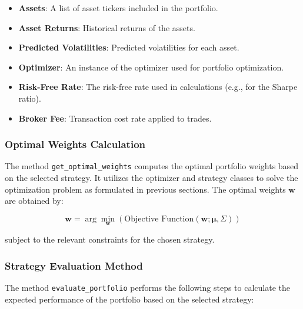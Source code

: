\begin{itemize}
    \item \textbf{Assets}: A list of asset tickers included in the portfolio.
    \item \textbf{Asset Returns}: Historical returns of the assets.
    \item \textbf{Predicted Volatilities}: Predicted volatilities for each asset.
    \item \textbf{Optimizer}: An instance of the optimizer used for portfolio optimization.
    \item \textbf{Risk-Free Rate}: The risk-free rate used in calculations (e.g., for the Sharpe ratio).
    \item \textbf{Broker Fee}: Transaction cost rate applied to trades.
\end{itemize}

\subsubsection{Optimal Weights Calculation}

The method \texttt{get\_optimal\_weights} computes the optimal portfolio weights based on the selected strategy. It utilizes the optimizer and strategy classes to solve the optimization problem as formulated in previous sections. The optimal weights \( \mathbf{w} \) are obtained by:

\[
\mathbf{w} = \arg\min_{\mathbf{w}} \left( \text{Objective Function}(\mathbf{w}; \boldsymbol{\mu}, \Sigma) \right)
\]

subject to the relevant constraints for the chosen strategy.

\subsubsection{Strategy Evaluation Method}

The method \texttt{evaluate\_portfolio} performs the following steps to calculate the expected performance of the portfolio based on the selected strategy:


